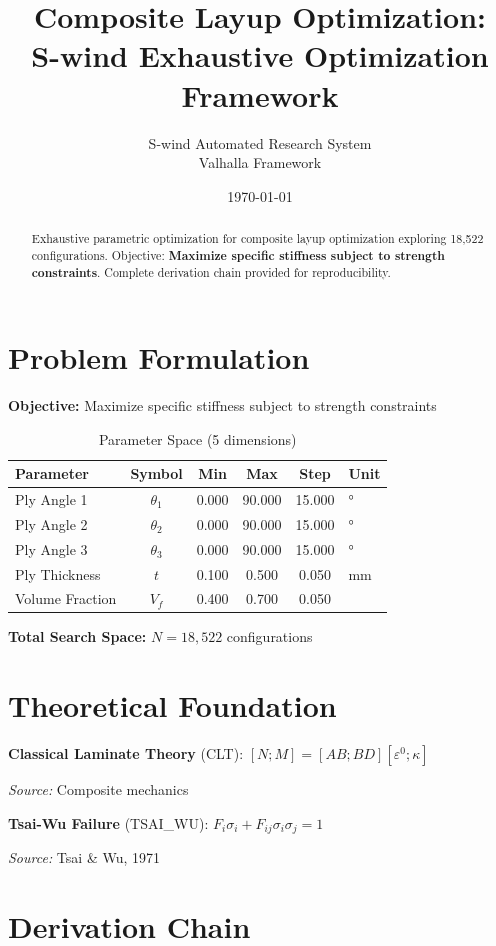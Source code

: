 \documentclass[11pt,twocolumn]{article}
\title{Composite Layup Optimization: \\S-wind Exhaustive Optimization Framework}
\author{S-wind Automated Research System\\Valhalla Framework}
\date{\today}
\begin{document}
\maketitle

\begin{abstract}
Exhaustive parametric optimization for composite layup optimization exploring 18,522 configurations.
Objective: \textbf{Maximize specific stiffness subject to strength constraints}.
Complete derivation chain provided for reproducibility.
\end{abstract}

\section{Problem Formulation}
\textbf{Objective:} Maximize specific stiffness subject to strength constraints

\begin{table}[h]
\centering
\caption{Parameter Space (5 dimensions)}
\begin{tabular}{@{}lccccl@{}}
\toprule
Parameter & Symbol & Min & Max & Step & Unit \\
\midrule
Ply Angle 1 & $\theta_1$ & 0.000 & 90.000 & 15.000 & ° \\
Ply Angle 2 & $\theta_2$ & 0.000 & 90.000 & 15.000 & ° \\
Ply Angle 3 & $\theta_3$ & 0.000 & 90.000 & 15.000 & ° \\
Ply Thickness & $t$ & 0.100 & 0.500 & 0.050 & mm \\
Volume Fraction & $V_f$ & 0.400 & 0.700 & 0.050 &  \\
\bottomrule
\end{tabular}
\end{table}

\textbf{Total Search Space:} $N = 18,522$ configurations

\section{Theoretical Foundation}
\textbf{Classical Laminate Theory} (CLT): $[N;M] = [A B; B D][\varepsilon^0; \kappa]$

\textit{Source:} Composite mechanics

\textbf{Tsai-Wu Failure} (TSAI_WU): $F_i\sigma_i + F_{ij}\sigma_i\sigma_j = 1$

\textit{Source:} Tsai & Wu, 1971


\section{Derivation Chain}
\end{document}
